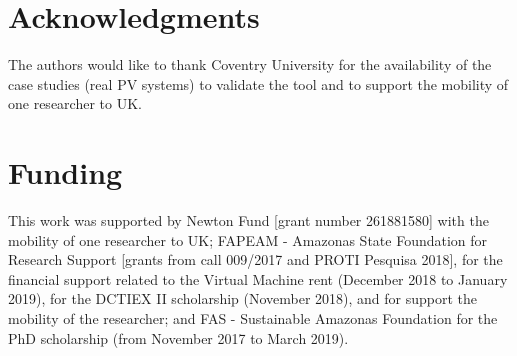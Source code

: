 \documentclass[review]{elsarticle}
\begin{document}
\section*{Acknowledgments}
The authors would like to thank Coventry University for the availability of the case studies (real PV systems) to validate the tool and to support the mobility of one researcher to UK. 

\section*{Funding}
This work was supported by Newton Fund [grant number 261881580] with the mobility of one researcher to UK; FAPEAM - Amazonas State Foundation for Research Support [grants from call 009/2017 and PROTI Pesquisa 2018], for the financial support related to the Virtual Machine rent (December 2018 to January 2019), for the DCTIEX II scholarship (November 2018), and for support the mobility of the researcher; and FAS - Sustainable Amazonas Foundation for the PhD scholarship (from November 2017 to March 2019).


%

\end{document}
